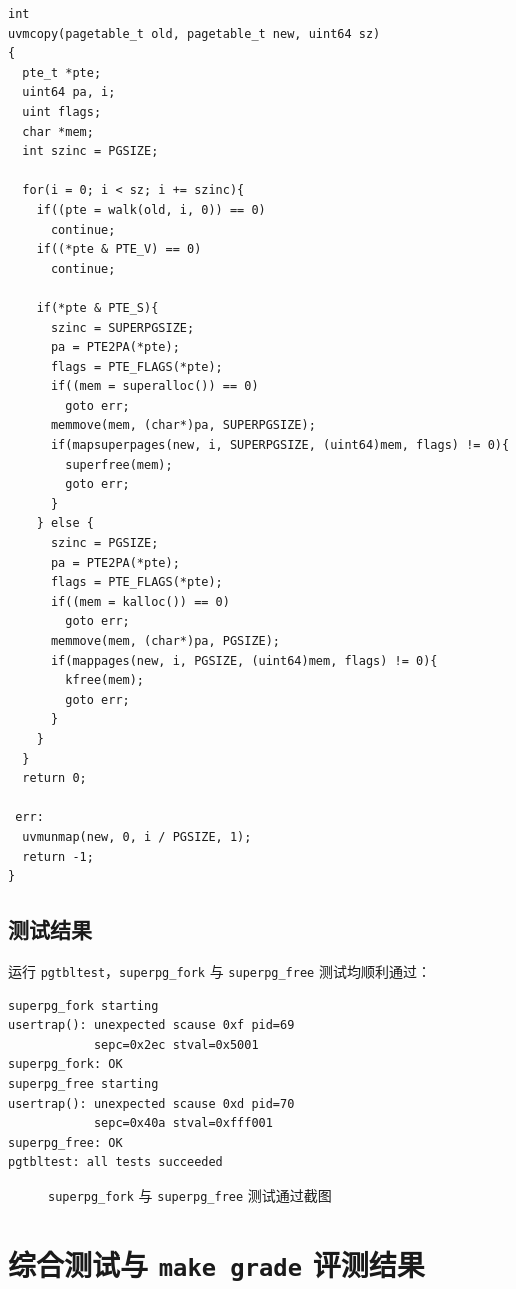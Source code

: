 \documentclass[12pt, a4paper]{ctexart}
\begin{document}
\begin{lstlisting}[caption={\texttt{uvmunmap}（含超级页降级 Demote）、\texttt{uvmalloc} 与 \texttt{uvmcopy} 核心实现}]
int
uvmcopy(pagetable_t old, pagetable_t new, uint64 sz)
{
  pte_t *pte;
  uint64 pa, i;
  uint flags;
  char *mem;
  int szinc = PGSIZE;

  for(i = 0; i < sz; i += szinc){
    if((pte = walk(old, i, 0)) == 0)
      continue;
    if((*pte & PTE_V) == 0)
      continue;

    if(*pte & PTE_S){
      szinc = SUPERPGSIZE;
      pa = PTE2PA(*pte);
      flags = PTE_FLAGS(*pte);
      if((mem = superalloc()) == 0)
        goto err;
      memmove(mem, (char*)pa, SUPERPGSIZE);
      if(mapsuperpages(new, i, SUPERPGSIZE, (uint64)mem, flags) != 0){
        superfree(mem);
        goto err;
      }
    } else {
      szinc = PGSIZE;
      pa = PTE2PA(*pte);
      flags = PTE_FLAGS(*pte);
      if((mem = kalloc()) == 0)
        goto err;
      memmove(mem, (char*)pa, PGSIZE);
      if(mappages(new, i, PGSIZE, (uint64)mem, flags) != 0){
        kfree(mem);
        goto err;
      }
    }
  }
  return 0;

 err:
  uvmunmap(new, 0, i / PGSIZE, 1);
  return -1;
}
\end{lstlisting}

\subsection{测试结果}
运行 \texttt{pgtbltest}，\texttt{superpg\_fork} 与 \texttt{superpg\_free} 测试均顺利通过：
\begin{lstlisting}[language={}, caption={\texttt{superpg\_fork} 与 \texttt{superpg\_free} 运行输出}]
superpg_fork starting
usertrap(): unexpected scause 0xf pid=69
            sepc=0x2ec stval=0x5001
superpg_fork: OK
superpg_free starting
usertrap(): unexpected scause 0xd pid=70
            sepc=0x40a stval=0xfff001
superpg_free: OK
pgtbltest: all tests succeeded
\end{lstlisting}

\begin{figure}[H]
    \centering
    \caption{\texttt{superpg\_fork} 与 \texttt{superpg\_free} 测试通过截图}
    \label{fig:superpg_test}
\end{figure}

\section{综合测试与 \texttt{make grade} 评测结果}
\end{document}
